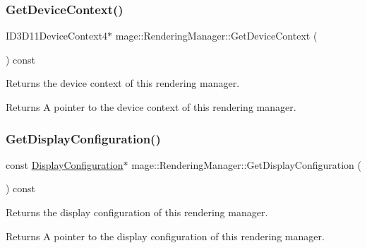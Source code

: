 \subsubsection{\texorpdfstring{Get\+Device\+Context()}{GetDeviceContext()}}
{\footnotesize\ttfamily I\+D3\+D11\+Device\+Context4$\ast$ mage\+::\+Rendering\+Manager\+::\+Get\+Device\+Context (\begin{DoxyParamCaption}{ }\end{DoxyParamCaption}) const\hspace{0.3cm}{\ttfamily [noexcept]}}

Returns the device context of this rendering manager.

\begin{DoxyReturn}{Returns}
A pointer to the device context of this rendering manager. 
\end{DoxyReturn}
\hypertarget{classmage_1_1_rendering_manager_a4d134773977675c902974bb3f914370e}{}\label{classmage_1_1_rendering_manager_a4d134773977675c902974bb3f914370e} 
\subsubsection{\texorpdfstring{Get\+Display\+Configuration()}{GetDisplayConfiguration()}}
{\footnotesize\ttfamily const \hyperlink{structmage_1_1_display_configuration}{Display\+Configuration}$\ast$ mage\+::\+Rendering\+Manager\+::\+Get\+Display\+Configuration (\begin{DoxyParamCaption}{ }\end{DoxyParamCaption}) const\hspace{0.3cm}{\ttfamily [noexcept]}}

Returns the display configuration of this rendering manager.

\begin{DoxyReturn}{Returns}
A pointer to the display configuration of this rendering manager. 
\end{DoxyReturn}
\hypertarget{classmage_1_1_rendering_manager_a5b357f9f7e241945ac396cd09ba3be7e}{}\label{classmage_1_1_rendering_manager_a5b357f9f7e241945ac396cd09ba3be7e} 
